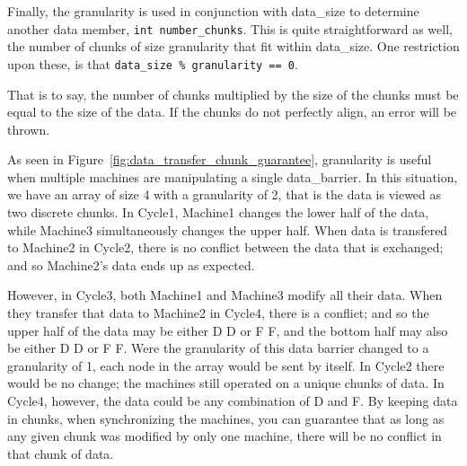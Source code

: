 \documentclass[../thesis.tex]{subfiles}
\begin{document}
    Finally, the granularity is used in conjunction with data\_size to determine another data member, \texttt{int number\_chunks}. This is quite straightforward as well, the number of chunks of size granularity that fit within data\_size. One restriction upon these, is that \texttt{data\_size \% granularity == 0}.

    That is to say, the number of chunks multiplied by the size of the chunks must be equal to the size of the data. If the chunks do not perfectly align, an error will be thrown.
 
    As seen in Figure~\ref{fig:data_transfer_chunk_guarantee}, granularity is useful when multiple machines are manipulating a single data\_barrier. In this situation, we have an array of size 4 with a granularity of 2, that is the data is viewed as two discrete chunks. In Cycle1, Machine1 changes the lower half of the data, while Machine3 simultaneously changes the upper half. When data is transfered to Machine2 in Cycle2, there is no conflict between the data that is exchanged; and so Machine2's data ends up as expected.

    However, in Cycle3, both Machine1 and Machine3 modify all their data. When they transfer that data to Machine2 in Cycle4, there is a conflict; and so the upper half of the data may be either D D or F F, and the bottom half may also be either D D or F F. Were the granularity of this data barrier changed to a granularity of 1, each node in the array would be sent by itself. In Cycle2 there would be no change; the machines still operated on a unique chunks of data. In Cycle4, however, the data could be any combination of D and F. By keeping data in chunks, when synchronizing the machines, you can guarantee that as long as any given chunk was modified by only one machine, there will be no conflict in that chunk of data.
\end{document}
